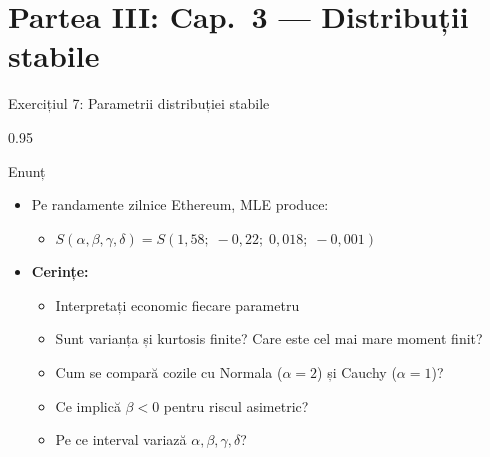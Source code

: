 \documentclass[9pt, aspectratio=169, t]{beamer}
\begin{document}
\section{Partea III: Cap.~3 --- Distribuții stabile}

\begin{frame}[shrink=25]{Exercițiul 7: Parametrii distribuției stabile}
\begin{cminipage}{0.95\textwidth}
\begin{block}{Enunț}
\begin{itemize}\setlength{\itemsep}{0pt}
    \item Pe randamente zilnice Ethereum, MLE produce:
    \begin{itemize}\setlength{\itemsep}{0pt}
        \item $S(\alpha, \beta, \gamma, \delta) = S(1{,}58;\; -0{,}22;\; 0{,}018;\; -0{,}001)$
    \end{itemize}
    \item \textbf{Cerințe:}
    \begin{itemize}\setlength{\itemsep}{0pt}
        \item Interpretați economic fiecare parametru
        \item Sunt varianța și kurtosis finite? Care este cel mai mare moment finit?
        \item Cum se compară cozile cu Normala ($\alpha = 2$) și Cauchy ($\alpha = 1$)?
        \item Ce implică $\beta < 0$ pentru riscul asimetric?
        \item Pe ce interval variază $\alpha, \beta, \gamma, \delta$?
    \end{itemize}
\end{itemize}
\end{block}
\end{cminipage}
\end{frame}
\end{document}
